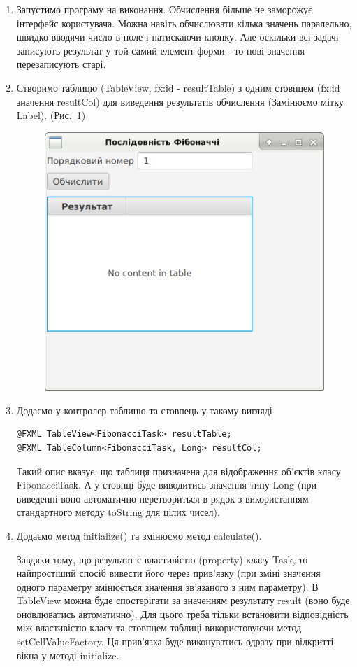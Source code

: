 \begin{enumerate}
	\item Запустимо програму на виконання.
Обчислення більше не заморожує інтерфейс користувача. Можна навіть обчислювати кілька значень паралельно, швидко вводячи число в поле і натискаючи кнопку. Але оскільки всі задачі записують результат у той самий елемент форми - то нові значення перезаписують старі. 

	\item Створимо таблицю (TableView, fx:id - resultTable) з одним стовпцем (fx:id значення resultCol) для виведення результатів обчислення (Замінюємо мітку Label). (Рис.~\ref{fig:image3})
	
	\begin{figure}[h]
		\includegraphics{chapter21/images/image3.png}
		\caption{}
		\label{fig:image3}
	\end{figure}

	\item Додаємо у контролер таблицю та стовпець у такому вигляді
\begin{verbatim}
@FXML TableView<FibonacciTask> resultTable;
@FXML TableColumn<FibonacciTask, Long> resultCol;
\end{verbatim}
Такий опис вказує, що таблиця призначена для відображення об'єктів класу FibonacciTask. А у стовпці буде виводитись значення типу Long (при виведенні воно автоматично перетвориться в рядок з використанням стандартного методу toString для цілих чисел).

	\item Додаємо метод initialize(){} та змінюємо метод  calculate().

	Завдяки тому, що результат є властивістю (property) класу Task, то найпростіший спосіб вивести його через прив'язку (при зміні значення одного параметру змінюється значення зв'язаного з ним параметру). В TableView можна буде спостерігати за значенням результату result (воно буде оновлюватись автоматично). Для цього треба тільки встановити відповідність між властивістю класу та стовпцем таблиці використовуючи метод setCellValueFactory. Ця прив'язка буде виконуватись одразу при відкритті вікна у методі initialize.


\end{enumerate}
